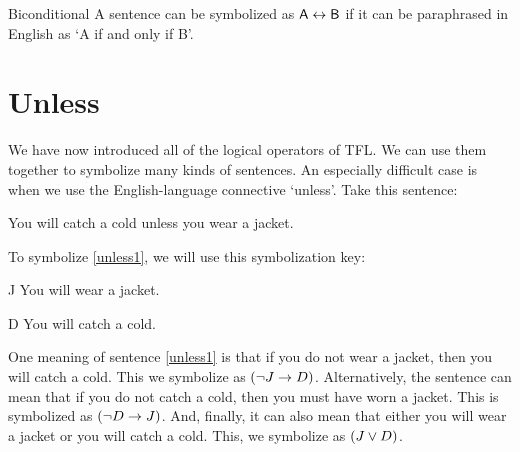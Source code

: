 \begin{factboxy}{Biconditional}
A sentence can be symbolized as $\mathsf{A} \leftrightarrow \mathsf{B}$ if it can be paraphrased in English as `A if and only if B'.
\end{factboxy}
	

\section{Unless}\label{s:unless}
We have now introduced all of the logical operators of TFL. We can use them together to symbolize many kinds of sentences. An especially difficult case is when we use the English-language connective `unless'. Take this sentence:

\begin{earg}
\item[\ex{unless1}] You will catch a cold unless you wear a jacket. 
\end{earg}
To symbolize \ref{unless1}, we will use this symbolization key:
	\begin{ekey}
		\item[J] You will wear a jacket.
		\item[D] You will catch a cold.
	\end{ekey}

One meaning of sentence \ref{unless1} is that if you do not wear a jacket, then you will catch a cold. This we symbolize as $({\neg} J \rightarrow D)$. Alternatively, the sentence can mean that if you do not catch a cold, then you must have worn a jacket. This is symbolized as $({\neg} D \rightarrow J)$. And, finally, it can also mean that either you will wear a jacket or you will catch a cold. This, we symbolize as $(J \vee D)$.


